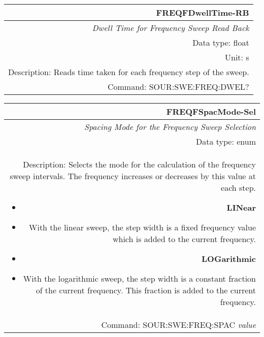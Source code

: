 \documentclass[openany]{article}
\begin{document}
		\begin{tabular}{N}
			\hline
			\bfseries FREQFDwellTime-RB \\ \hline
			\emph{Dwell Time for Frequency Sweep Read Back} \\
			Data type: float \\
			Unit: s \\
			Description: Reads time taken for each frequency step of the sweep. \\
			Command: SOUR:SWE:FREQ:DWEL? \\

		\end{tabular}
%
		\begin{tabular}{N}
			\hline
			\bfseries FREQFSpacMode-Sel \\ \hline
			\emph{Spacing Mode for the Frequency Sweep Selection} \\
			Data type: enum \\
			Description: Selects the mode for the calculation of the frequency sweep intervals. The frequency increases or decreases by this value at each step.\begin{itemize}[noitemsep]
				\small
				\item[] \textbf{LINear}
				\item[] With the linear sweep, the step width is a fixed frequency value which is added to the current frequency.
				\item[] \textbf{LOGarithmic}
				\item[] With the logarithmic sweep, the step width is a constant fraction of the current frequency. This fraction is added to the current frequency.
			\end{itemize} \\
			Command: SOUR:SWE:FREQ:SPAC \emph{value} \\

		\end{tabular}
\end{document}
